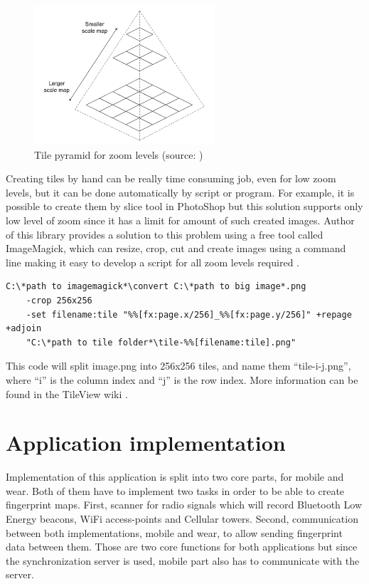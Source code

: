 \begin{figure}[H]
	\begin{centering}
		\includegraphics[width=0.6\textwidth]{img/tile_pyramid}
		\par\end{centering}
	\caption{Tile pyramid for zoom levels (source: \cite{WTM})\label{fig:TilePyramid}}
	\label{fig03c05}
\end{figure}

Creating tiles by hand can be really time consuming job, even for low zoom levels, but it can be done automatically by script or program. For example, it is possible to create them by slice tool in PhotoShop but this solution supports only low level of zoom since it has a limit for amount of such created images. Author of this library provides a solution to this problem using a free tool called ImageMagick, which can resize, crop, cut and create images using a command line making it easy to develop a script for all zoom levels required \cite{TileView}.

\begin{lstlisting}[caption=Creating tiles using ImageMagick]
C:\*path to imagemagick*\convert C:\*path to big image*.png 
	-crop 256x256 
	-set filename:tile "%%[fx:page.x/256]_%%[fx:page.y/256]" +repage +adjoin 
	"C:\*path to tile folder*\tile-%%[filename:tile].png"
\end{lstlisting}

This code will split image.png into 256x256 tiles, and name them \enquote{tile-i-j.png}, where \enquote{i} is the column index and \enquote{j} is the row index. More information can be found in the TileView wiki \cite{TileViewWiki}.

\section{Application implementation}\label{sec:ApplicationImplementation}
Implementation of this application is split into two core parts, for mobile and wear. Both of them have to implement two tasks in order to be able to create fingerprint maps. First, scanner for radio signals which will record Bluetooth Low Energy beacons, WiFi access-points and Cellular towers. Second, communication between both implementations, mobile and wear, to allow sending fingerprint data between them. Those are two core functions for both applications but since the synchronization server is used, mobile part also has to communicate with the server.

